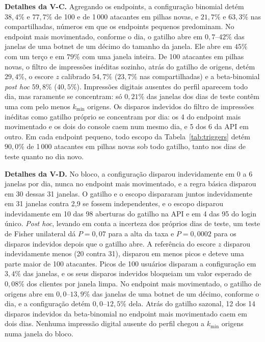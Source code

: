 \documentclass[conference,letterpaper,10pt]{IEEEtran}
\newcommand\1{\textit{(i)}}
\newcommand\2{\textit{(ii)}}
\newcommand\3{\textit{(iii)}}
\begin{document}
\textbf{Detalhes da V-C.} Agregando os endpoints, a configuração binomial detém $38{,}4\%$ e $77{,}7\%$ de 100 e de 1\,000 atacantes em pilhas novas, e $21{,}7\%$ e $63{,}3\%$ nas compartilhadas, números em que os endpoints pequenos predominam. No endpoint mais movimentado, conforme o dia, o gatilho abre em $0{,}7$--$42\%$ das janelas de uma botnet de um décimo do tamanho da janela. Ele abre em $45\%$ com um terço e em $79\%$ com uma janela inteira. De 100 atacantes em pilhas novas, o filtro de impressões inéditas sozinho, atrás do gatilho de origens, detém $29{,}4\%$, o escore $z$ calibrado $54{,}7\%$ ($23{,}7\%$ nas compartilhadas) e a beta-binomial \textit{post hoc} $59{,}8\%$ ($40{,}5\%$). Impressões digitais ausentes do perfil aparecem todo dia, mas raramente se concentram: só $0{,}21\%$ das janelas dos dias de teste contêm uma com pelo menos $k_{\min}$ origens. Os disparos indevidos do filtro de impressões inéditas como gatilho próprio se concentram por dia: os 4 do endpoint mais movimentado e os dois do console caem num mesmo dia, e 5 dos 6 da API em outro. Em cada endpoint pequeno, todo escopo da Tabela~\ref{tab:triggers} detém $90{,}0\%$ de 1\,000 atacantes em pilhas novas sob todo gatilho, tanto nos dias de teste quanto no dia novo.

\textbf{Detalhes da V-D.} No bloco, a configuração disparou indevidamente em 0 a 6 janelas por dia, nunca no endpoint mais movimentado, e a regra básica disparou em 30 dessas 31 janelas. O gatilho e o escopo dispararam juntos indevidamente em 31 janelas contra 2,9 se fossem independentes, e o escopo disparou indevidamente em 10 das 98 aberturas do gatilho na API e em 4 das 95 do login único. \textit{Post hoc}, levando em conta a incerteza dos próprios dias de teste, um teste de Fisher unilateral dá $P = 0{,}07$ para a alta da taxa e $P = 0{,}0002$ para os disparos indevidos depois que o gatilho abre. A referência do escore $z$ disparou indevidamente menos (20 contra 31), disparou em menos picos e deteve uma parte maior de 100 atacantes. Picos de 100 usuários disparam a configuração em $3{,}4\%$ das janelas, e os seus disparos indevidos bloqueiam um valor esperado de $0{,}08\%$ dos clientes por janela limpa. No endpoint mais movimentado, o gatilho de origens abre em $0{,}0$--$13{,}9\%$ das janelas de uma botnet de um décimo, conforme o dia, e a configuração detém $0{,}0$--$12{,}5\%$ dela. Atrás do gatilho sazonal, 12 dos 14 disparos indevidos da beta-binomial no endpoint mais movimentado caem em dois dias. Nenhuma impressão digital ausente do perfil chegou a $k_{\min}$ origens numa janela do bloco.
\end{document}

